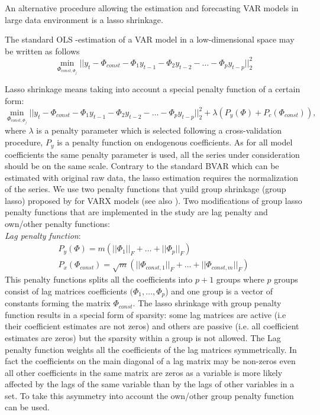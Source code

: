 \documentclass[12pt]{article} %
\begin{document}
An alternative procedure allowing the estimation and forecasting VAR models in large data environment is a lasso shrinkage. 

The standard OLS -estimation of a VAR model in a low-dimensional space may be written as follows
\begin{equation}
\min_{\Phi_{const, \Phi_j}} ||y_t -\Phi_{const}- \Phi_1 y_{t-1} - \Phi_2 y_{t-2} -\ldots - \Phi_p y_{t-p}||^2_2
\end{equation}

Lasso shrinkage means taking into account a special penalty function of a certain form:
 \begin{equation}
\min_{\Phi_{const, \Phi_j}} ||y_t -\Phi_{const}- \Phi_1 y_{t-1} - \Phi_2 y_{t-2} -\ldots - \Phi_p y_{t-p}||^2_2 +\lambda \left(P_y(\Phi)+P_c(\Phi_{const}) \right),
\end{equation} 
where $\lambda$ is a penalty parameter which is selected following a cross-validation procedure, $P_y$ is a penalty function on endogenous coefficients. As for all model coefficients the same penalty parameter is used, all the series under consideration should be on the same scale. Contrary to the standard BVAR which can be estimated with original raw data, the lasso estimation requires the normalization of the series.
We use two penalty functions that yuild group shrinkage (group lasso) proposed by   \autocite{yuan_lin_2006} for VARX models (see also \autocite{nicholson_al_2017}). 
Two modifications of group lasso penalty functions that are implemented in the study are lag   penalty and own/other penalty functions: \\
\textit{Lag penalty function}:  
\begin{gather}
P_y(\Phi) = m \left( ||\Phi_1||_{F}+\ldots + ||\Phi_p||_{F} \right) \\
P_x(\Phi_{const})= \sqrt{m}  \left( ||\Phi_{const,1}||_{F}+\ldots + ||\Phi_{const,m}||_{F} \right)
\end{gather}
 This penalty functions splits all the coefficients into $p+1$ groups where $p$ groups consist of lag matrices coefficients $(\Phi_1,\ldots, \Phi_p$) and one group is a vector of constants forming the matrix $\Phi_{const}$.
The lasso shrinkage with group penalty function results in a special form of sparsity: some lag matrices are active (i.e their coefficient estimates are not zeros) and others are passive (i.e. all coefficient estimates are zeros) but the sparsity within a group is not allowed.
The Lag penalty function weights all the coefficients of the lag matrices symmetrically. In fact the coefficients on the main diagonal of a lag matrix may be non-zeros even all other coefficients in the same matrix are zeros as a variable is more likely affected by the lags of the same variable than by the lags of other variables in a set. To take this asymmetry into account the own/other group penalty function can be used. \\
\end{document}
